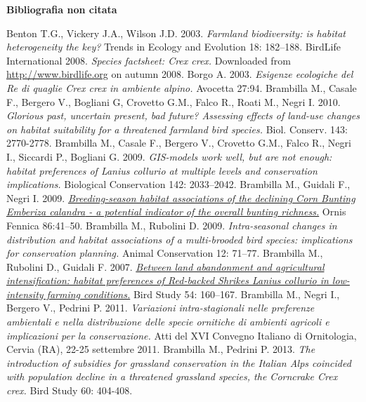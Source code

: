 \documentclass[10pt,twoside,openany,x11names,svgnames,italian,a5paper,dvipsnames,table]{memoir}
\begin{document}
\renewcommand*{\bibname}{Bigliorafia non citata}
\textbf{\large Bibliografia non citata}
\begin{thebibliography}{9}
\footnotesize
{}Benton T.G., Vickery J.A., Wilson J.D. 2003. \emph{Farmland biodiversity: is habitat heterogeneity the key?} Trends in Ecology and Evolution 18: 182–188. 
BirdLife International 2008. \emph{Species factsheet: \emph{Crex crex.}} Downloaded from \url{http://www.birdlife.org} on autumn 2008.
Borgo A. 2003. \emph{Esigenze ecologiche del Re di quaglie \emph{Crex crex} in ambiente alpino.} Avocetta 27:94.
Brambilla M., Casale F., Bergero V., Bogliani G, Crovetto G.M., Falco R., Roati M., Negri I. 2010. \emph{Glorious past, uncertain present, bad future? Assessing effects of land-use changes on habitat suitability for a threatened farmland bird species.} Biol. Conserv. 143: 2770-2778.
Brambilla M., Casale F., Bergero V., Crovetto G.M., Falco R., Negri I., Siccardi P., Bogliani G. 2009. \emph{GIS-models work well, but are not enough: habitat preferences of \emph{Lanius collurio} at multiple levels and conservation implications.} Biological Conservation 142: 2033–2042.
Brambilla M., Guidali F., Negri I. 2009. \href{http://www.birdlife.fi/ornisfennica/pdf/2009/of_86_41-50.pdf}{\emph{Breeding-season habitat associations of the declining Corn Bunting \emph{Emberiza calandra} - a potential indicator of the overall bunting richness.}} Ornis Fennica 86:41–50.
Brambilla M., Rubolini D. 2009. \emph{Intra-seasonal changes in distribution and habitat associations of a multi-brooded bird species: implications for conservation planning.} Animal Conservation 12: 71–77.
Brambilla M., Rubolini D., Guidali F. 2007. \href{http://www.tandfonline.com/doi/pdf/10.1080/00063650709461471}{\emph{Between land abandonment and agricultural intensification: habitat preferences of Red-backed Shrikes \emph{Lanius collurio} in low-intensity farming conditions.}} Bird Study 54: 160–167.
Brambilla M., Negri I., Bergero V., Pedrini P. 2011. \emph{Variazioni intra-stagionali nelle preferenze ambientali e nella distribuzione delle specie ornitiche di ambienti agricoli e implicazioni per la conservazione.} Atti del XVI Convegno Italiano di Ornitologia, Cervia (RA), 22-25 settembre 2011.
Brambilla M., Pedrini P. 2013. \emph{The introduction of subsidies for grassland conservation in the Italian Alps coincided with population decline in a threatened grassland species, the Corncrake \emph{Crex crex.}} Bird Study 60: 404-408.

\end{thebibliography}
\end{document}
